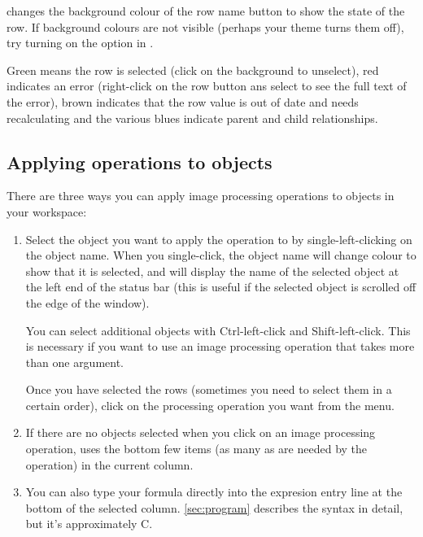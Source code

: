 \nip{} changes the background colour of the row name button to show the state
of the row. If background colours are not visible (perhaps your theme turns
them off), try turning on the  option in
.

Green means the row is selected (click on the background to unselect), red
indicates an error (right-click on the row button ans select 
to see the full text of the error), brown indicates that the row value is out 
of date and needs recalculating and the various blues indicate parent and
child relationships.

\subsection{Applying operations to objects}

There are three ways you can apply image processing operations to objects
in your workspace:

\begin{enumerate}

\item
Select the object you want to apply the operation to by single-left-clicking
on the object name. When you single-click, the object name will change
colour to show that it is selected, and \nip{} will display the name of
the selected object at the left end of the status bar (this is
useful if the selected object is scrolled off the edge of the window).

You can select additional objects with Ctrl-left-click and
Shift-left-click. This is necessary if you want to use an image
processing operation that takes more than one argument.

Once you have selected the rows (sometimes you need to select them in
a certain order), click on the processing operation you want from the
 menu.

\item
If there are no objects selected when you click on an image processing
operation, \nip{} uses the bottom few items (as many as are needed by the
operation) in the current column. 

\item
You can also type your formula directly into the expresion
entry line at the bottom of the selected column. \cref{sec:program} describes
the syntax in detail, but it's approximately C.

\end{enumerate}

